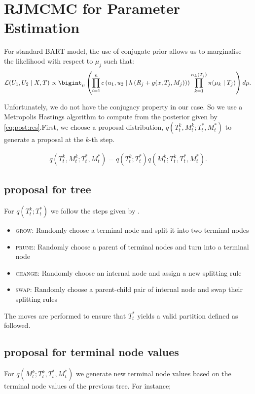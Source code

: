 \documentclass{amsart}
\begin{document}
\section{RJMCMC for Parameter Estimation}\label{sec:rjmcmc}
For standard BART model, the use of conjugate prior allows us to marginalise the likelihood with respect to $\mu_j$ such that:
\begin{equation}
	\mathcal{L}(U_1,U_2\mid X, T)\propto \bigint_{\mu}\left(\prod_{i=1}^{n}c\left(u_{1},u_{2}\mid h\left(R_j+g(x, T_j, M_j)\right)\right)\prod_{k=1}^{n_L(T_j)}\pi(\mu_k\mid T_j)\right)d\mu.
\end{equation}

Unfortunately, we do not have the conjugacy property in our case. So we use a Metropolis Hastings algorithm to compute from the posterior given by \cref{eq:post:res}.First, we choose a proposal distribution, $q\left(T_t^k,M_t^k;T_t^\ast, M_t^\ast\right)$ to generate a proposal at the $k$-th step.

\begin{align}\label{eq:prop}
	q\left(T_t^k,M_t^k;T_t^\ast, M_t^\ast\right) = q\left(T_t^k;T_t^\ast\right) q\left(M_t^k;T_t^k, T_t^\ast, M_t^\ast\right).
\end{align}

\subsection{proposal for tree}
For $q\left(T_t^k;T_t^\ast\right)$ we follow the steps given by \citet{serafini2024lossbasedpriortreetopologies}. 

\begin{itemize}
	\item \textsc{grow}: Randomly choose a terminal node and split it into two terminal nodes
	\item \textsc{prune}: Randomly choose a parent of terminal nodes and turn into a terminal node
	\item \textsc{change}: Randomly choose an internal node and assign a new splitting rule
	\item \textsc{swap}: Randomly choose a parent-child pair of internal node and swap their splitting rules
\end{itemize}

The moves are performed to ensure that $T_t^\ast$ yields a valid partition defined as followed.

\subsection{proposal for terminal node values}
For $q\left(M_t^k;T_t^k, T_t^\ast, M_t^\ast\right)$ we generate new terminal node values based on the terminal node values of the previous tree. For instance;
\end{document}
